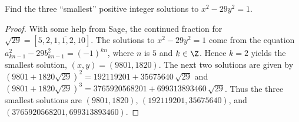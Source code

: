 \documentclass[10pt]{amsart}
\begin{document}
\begin{ex2}
  Find the three ``smallest'' positive integer solutions to $x^2 - 29y^2 = 1$.
  \begin{proof}
    With some help from Sage, the continued fraction for $\sqrt{29} = [5, \overline{2, 1, 1, 2, 10}]$.
    The solutions to $x^2 - 29y^2 = 1$ come from the equation $a_{kn-1}^2 - 29b_{kn-1}^2 = (-1)^{kn}$, where $n$ is $5$ and $k\in \Z$.
    Hence $k=2$ yields the smallest solution, $(x,y) = (9801,1820)$. 
    The next two solutions are given by $(9801 + 1820\sqrt{29})^2 = 192119201 + 35675640 \, \sqrt{29}$ and $(9801 + 1820\sqrt{29})^3 = 3765920568201 + 699313893460 \, \sqrt{29}$.
    Thus the three smallest solutions are $(9801,1820)$, $(192119201, 35675640)$, and $(3765920568201, 699313893460)$.
  \end{proof}
\end{ex2}
\end{document}
